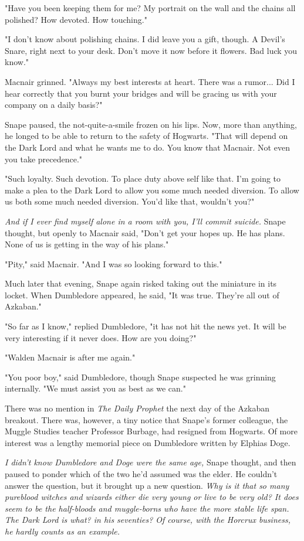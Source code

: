 \documentclass[a4paper,11pt]{article}
\begin{document}
"Have you been keeping them for me? My portrait on the wall and the chains all polished? How devoted. How touching."

"I don't know about polishing chains. I did leave you a gift, though. A Devil's Snare, right next to your desk. Don't move it now before it flowers. Bad luck you know."

Macnair grinned. "Always my best interests at heart. There was a rumor... Did I hear correctly that you burnt your bridges and will be gracing us with your company on a daily basis?"

Snape paused, the not-quite-a-smile frozen on his lips. Now, more than anything, he longed to be able to return to the safety of Hogwarts. "That will depend on the Dark Lord and what he wants me to do. You know that Macnair. Not even you take precedence."

"Such loyalty. Such devotion. To place duty above self like that. I'm going to make a plea to the Dark Lord to allow you some much needed diversion. To allow us both some much needed diversion. You'd like that, wouldn't you?"

\emph{And if I ever find myself alone in a room with you, I'll commit suicide.} Snape thought, but openly to Macnair said, "Don't get your hopes up. He has plans. None of us is getting in the way of his plans."

"Pity," said Macnair. "And I was so looking forward to this."

Much later that evening, Snape again risked taking out the miniature in its locket. When Dumbledore appeared, he said, "It was true. They're all out of Azkaban."

"So far as I know," replied Dumbledore, "it has not hit the news yet. It will be very interesting if it never does. How are you doing?"

"Walden Macnair is after me again."

"You poor boy," said Dumbledore, though Snape suspected he was grinning internally. "We must assist you as best as we can."

There was no mention in \emph{The Daily Prophet} the next day of the Azkaban breakout. There was, however, a tiny notice that Snape's former colleague, the Muggle Studies teacher Professor Burbage, had resigned from Hogwarts. Of more interest was a lengthy memorial piece on Dumbledore written by Elphias Doge.

\emph{I didn't know Dumbledore and Doge were the same age,} Snape thought, and then paused to ponder which of the two he'd assumed was the elder. He couldn't answer the question, but it brought up a new question. \emph{Why is it that so many pureblood witches and wizards either die very young or live to be very old? It does seem to be the half-bloods and muggle-borns who have the more stable life span. The Dark Lord is what? in his seventies? Of course, with the Horcrux business, he hardly counts as an example.}
\end{document}
